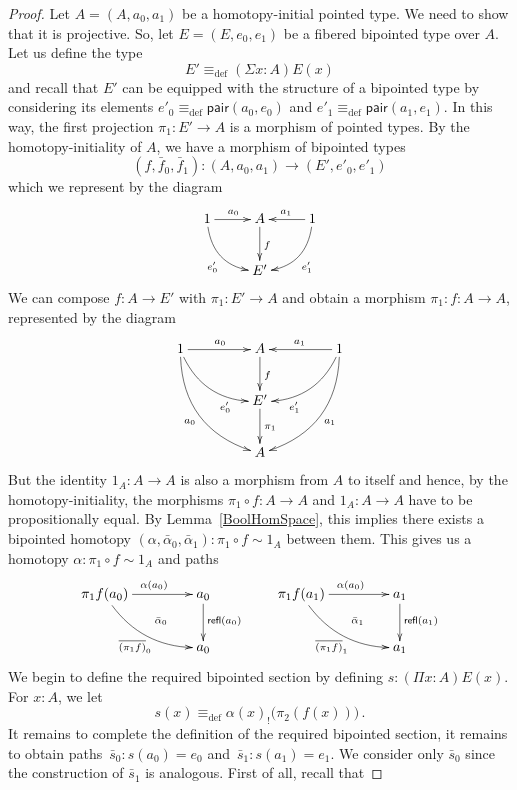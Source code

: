\documentclass[reqno,10pt,a4paper,oneside]{amsart}
\numberwithin{equation}{section}
\theoremstyle{mythm}
\theoremstyle{mydef}
\theoremstyle{myrmk}
\newcommand{\deq}{\equiv}
\newcommand{\peq}{=}
\newcommand{\defeq}{\deq_{\mathrm{def}}}
\newcommand{\co}{\colon}
\newcommand{\pair}{\mathsf{pair}}
\newcommand{\refl}{\mathsf{refl}}
\begin{document}
\begin{proof}
Let $A = (A, a_0, a_1)$ be a homotopy-initial pointed type. We need to show that it is projective. So, let $E = (E, e_0, e_1)$ be a fibered 
bipointed type over $A$. Let us define the type 
\[
E' \defeq (\Sigma x \co A) E(x) 
\]
and recall that $E'$ can be equipped with the structure of a bipointed type by considering its elements $e'_0 \defeq \pair(a_0, e_0)$ and $e'_1 \defeq \pair(a_1, e_1)$. In this way,  the first projection $\pi_1 \co E' \to A$ is a morphism of pointed types. By the homotopy-initiality of $A$, we have a morphism of bipointed types
\[
(f, \bar{f}_0, \bar{f}_1) \co (A, a_0, a_1)  \to (E', e'_0, e'_1) 
\]
which we represent by the diagram
\[
\xymatrix{
1 \ar@/_1pc/[dr]_{e'_0} \ar[r]^{a_0} & A  \ar[d]^f & 1 \ar[l]_{a_1} \ar@/^1pc/[dl]^{e'_1} \\
 & E' & }
 \]
 We can compose $f \co A \to E'$ with $\pi_1 \co E' \to A$ and obtain a morphism $\pi_1 \co f \co A \to A$, represented by the diagram
  \[
\xymatrix@C=1.5cm{
1 \ar@/_1pc/[dr]_(.7){e'_0} \ar[r]^{a_0} \ar@/_1.5pc/[ddr]_{a_0}  & A  \ar[d]^f & 1 \ar[l]_{a_1} \ar@/^1pc/[dl]^(.7){e'_1} \ar@/^1.5pc/[ddl]^{a_1}  \\
 & E' \ar[d]^{\pi_1} & \\
 & A &  }
 \]
But the identity $1_A \co A \to A$ is also a morphism from $A$ to itself and hence, by the homotopy-initiality, the morphisms $\pi_1 \circ f \co A \to A$
and $1_A \co A \to A$ have to be propositionally equal. By Lemma~\ref{BoolHomSpace}, this implies there exists a bipointed homotopy $(\alpha,
\bar{\alpha}_0,\bar{\alpha}_1) \co \pi_1 \circ f \sim 1_A$ between them. This gives us a homotopy $\alpha \co \pi_1 \circ f \sim 1_A$ and paths
\[
\xymatrix@C=1.5cm{
\pi_1 f (a_0) \ar[r]^{\alpha(a_0)} \ar@/_1pc/[dr]_{\overline{(\pi_1 f)}_0} \ar@{}[dr]|{\quad \bar{\alpha}_0}  & a_0 \ar[d]^{\refl(a_0)} \\
 & a_0 } \qquad
 \xymatrix@C=1.5cm{
\pi_1 f (a_1) \ar[r]^{\alpha(a_0)} \ar@/_1pc/[dr]_{\overline{(\pi_1 f)}_1} \ar@{}[dr]|{\quad \bar{\alpha}_1}  & a_1 \ar[d]^{\refl(a_1)} \\
 & a_1 }
\]
We begin to define the required bipointed section by defining  $s \co (\Pi x \co A) E(x)$. For $x \co A$, we let
\begin{equation}
\label{equ:defreqsection}
s(x) \defeq \alpha(x)_{!} \big( \pi_2(f(x)) \big) \, . 
\end{equation}
It remains to complete the definition of the required bipointed section, it remains to obtain paths~$\bar{s}_0 \co s(a_0)  \peq e_0$ and~$\bar{s}_1 \co s(a_1) \peq e_1$. We consider only $\bar{s}_0$ since the construction of $\bar{s}_1$ is  analogous. First of all, recall that 

\end{proof}
\end{document}

